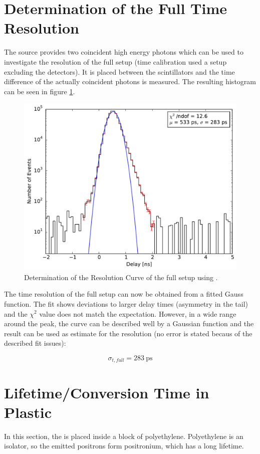\documentclass[
	paper=A4,
	parskip=full,
	chapterprefix=true,
	11pt,
	headings=normal,
	bibliography=totoc,
	listof=totoc,
	titlepage=on,
]{scrreprt}
\begin{document}
\section{Determination of the Full Time Resolution}
The  source provides two coincident high energy photons which can be used to investigate the resolution of the full setup (time calibration used a setup excluding the detectors). It is placed between the scintillators and the time difference of the actually coincident photons is measured. The resulting histogram can be seen in figure \ref{fig:resolution_peak}. 

\begin{figure}
	\centering
	\includegraphics{resolution_peak}
	\caption{Determination of the Resolution Curve of the full setup using .}
	\label{fig:resolution_peak}
\end{figure}

The time resolution of the full setup can now be obtained from a fitted Gauss function. The fit shows deviations to larger delay times (asymmetry in the tail) and the $\chi^2$ value does not match the expectation. However, in a wide range around the peak, the curve can be described well by a Gaussian function and the result can be used as estimate for the resolution (no error is stated becaus of the described fit issues):

\begin{equation}
	\sigma_{t,full}=\SI{283}{\pico\second}
\end{equation}

\section{Lifetime/Conversion Time in Plastic}
In this section, the  is placed inside a block of polyethylene. Polyethylene is an isolator, so the emitted positrons form positronium, which has a long lifetime. 
\end{document}
